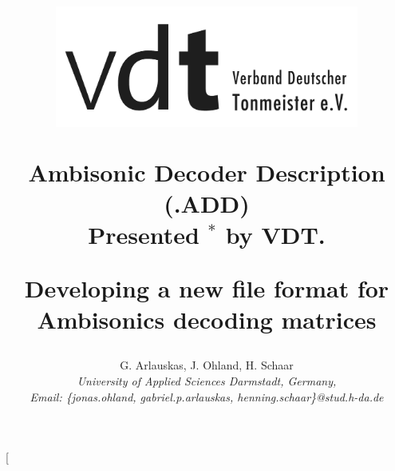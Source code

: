 \documentclass[a4paper, 10pt, twocolumn]{article}
\begin{document}
\fancyhf{} %

\chead{\underline{\sffamily\large\textcolor{gray}{5th International Conference on Spatial Audio ICSA, September 2019}}}
\renewcommand{\headrulewidth}{0pt}
\rhead{}
\renewcommand{\headrulewidth}{0pt}
\rhead{}


\date{}											%

\title{
\vspace{-5mm}%
\mbox{\includegraphics[height=4cm]{VDT}}
%
\vspace{7mm}%
%
\begin{center}
\textbf{\Huge Ambisonic Decoder Description (.ADD)}\\
{ Presented  $^*$ by VDT.}
\end{center}
\vspace{10mm}%
\begin{center}
\textbf\mdseries Developing a new file format for Ambisonics decoding matrices
\end{center}
%
\mbox{}\vspace{-11mm}
%
}

\author{ %
%
G. Arlauskas, J. Ohland, H. Schaar\\
%
\textit{\large %
University of Applied Sciences Darmstadt, Germany,}\\
\textit{\large Email: \{jonas.ohland, gabriel.p.arlauskas, henning.schaar\}@stud.h-da.de
}\\
%
}
%

\twocolumn[
\maketitle
\thispagestyle{fancy}
%
\end{document}

